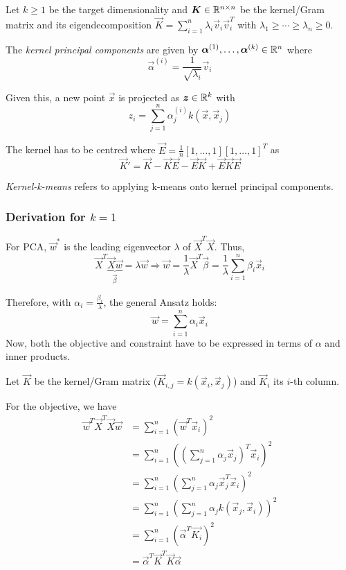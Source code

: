 Let $k \geq 1$ be the target dimensionality
and $\boldsymbol{K} \in \mathbb{R}^{n \times n}$
be the kernel/Gram matrix and its eigendecomposition
$\vec{K} = \sum_{i=1}^n{\lambda_i \vec{v}_i \vec{v}_i^T}$
with $\lambda_1 \geq \dotsb \geq \lambda_n \geq 0$.

The \emph{kernel principal components} are given by
$\boldsymbol{\alpha}^{(1)}, \dotsc, \boldsymbol{\alpha}^{(k)} \in \mathbb{R}^n$
where
\begin{equation*}
\vec{\alpha}^{(i)} = \frac{1}{\sqrt{\lambda_i}}
\vec{v}_i
\end{equation*}

Given this, a new point $\vec{x}$ is projected as
$\boldsymbol{z} \in \mathbb{R}^k$ with
\begin{equation*}
z_i = \sum_{j=1}^n{
	\alpha_j^{(i)} k(\vec{x}, \vec{x}_j)
}
\end{equation*}

The kernel has to be centred where
$\vec{E} = \frac{1}{n} [1, \dotsc, 1] [1, \dotsc, 1]^T$ as
\begin{equation*}
\vec{K}' = \vec{K} - \vec{K}\vec{E} - \vec{E}\vec{K} + \vec{E}\vec{K}\vec{E}
\end{equation*}

\emph{Kernel-k-means} refers to applying k-means onto
kernel principal components.


\subsubsection{Derivation for $k=1$}
For PCA, $\vec{w}^*$ is the leading eigenvector $\lambda$
of $\vec{X}^T \vec{X}$.
Thus,
\begin{equation*}
\vec{X}^T \underbrace{\vec{X} \vec{w}}_{\vec{\beta}}
= \lambda \vec{w}
\Rightarrow
\vec{w} = \frac{1}{\lambda} \vec{X}^T \vec{\beta}
= \frac{1}{\lambda} \sum_{i=1}^{n}{\beta_i \vec{x}_i}
\end{equation*}

Therefore, with $\alpha_i = \frac{\beta_i}{\lambda}$,
the general Ansatz holds:
\begin{equation*}
\vec{w} = \sum_{i=1}^n{\alpha_i \vec{x}_i}
\end{equation*}
Now, both the objective and constraint have to be expressed in
terms of $\alpha$ and inner products.

Let $\vec{K}$ be the kernel/Gram matrix
($\vec{K}_{i,j} = k(\vec{x}_i, \vec{x}_j)$)
and $\vec{K}_i$ its $i$-th column.

For the objective, we have
\begin{align*}
\vec{w}^T \vec{X}^T \vec{X} \vec{w} &=
\sum_{i=1}^n{(\vec{w}^T \vec{x}_i)^2} \\
&= \sum_{i=1}^n{\left((
	\sum_{j=1}^n{\alpha_j \vec{x}_j}
	)^T \vec{x}_i\right)^2} \\
&= \sum_{i=1}^n{\left(
	\sum_{j=1}^n{\alpha_j \vec{x}_j^T \vec{x}_i}
	\right)^2} \\
&= \sum_{i=1}^n{\left(
	\sum_{j=1}^n{\alpha_j k(\vec{x}_j, \vec{x}_i)}
	\right)^2} \\
&= \sum_{i=1}^n{\left(
	\vec{\alpha}^T \vec{K_i}
	\right)^2} \\
&= \vec{\alpha}^T \vec{K}^T \vec{K} \vec{\alpha}
\end{align*}

